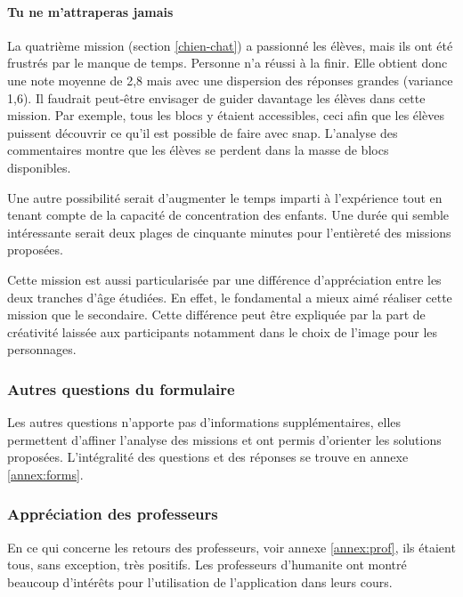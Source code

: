 \paragraph{Tu ne m'attraperas jamais}
La quatrième \gls{mission} (section \ref{chien-chat}) a passionné les élèves, mais ils ont été frustrés par le manque de temps. Personne n'a réussi à la finir. Elle obtient donc une note moyenne de 2,8 mais avec une dispersion des réponses grandes (variance 1,6). Il faudrait peut-être envisager de guider davantage les élèves dans cette \gls{mission}. Par exemple, tous les \glspl{bloc} y étaient accessibles, ceci afin que les élèves puissent découvrir ce qu'il est possible de faire avec \gls{snap}. L'analyse des commentaires montre que les élèves se perdent dans la masse de \glspl{bloc} disponibles.

Une autre possibilité serait d'augmenter le temps imparti à l'expérience tout en tenant compte de la capacité de concentration des enfants. Une durée qui semble intéressante serait deux plages de cinquante minutes pour l'entièreté des missions proposées.

Cette \gls{mission} est aussi particularisée par une différence d'appréciation entre les deux tranches d'âge étudiées. En effet, le \gls{fondamental} a mieux aimé réaliser cette \gls{mission} que le \gls{secondaire}. Cette différence peut être expliquée par la part de créativité laissée aux participants notamment dans le choix de l'image pour les personnages.
\subsubsection{Autres questions du formulaire}
Les autres questions n'apporte pas d'informations supplémentaires, elles permettent d'affiner l'analyse des missions et ont permis d'orienter les solutions proposées. L'intégralité des questions et des réponses se trouve en annexe \ref{annex:forms}.
\subsubsection{Appréciation des professeurs}
En ce qui concerne les retours des professeurs, voir annexe \ref{annex:prof}, ils étaient tous, sans exception, très positifs. Les professeurs d'\gls{humanite} ont montré beaucoup d'intérêts pour l'utilisation de l'application dans leurs cours.

